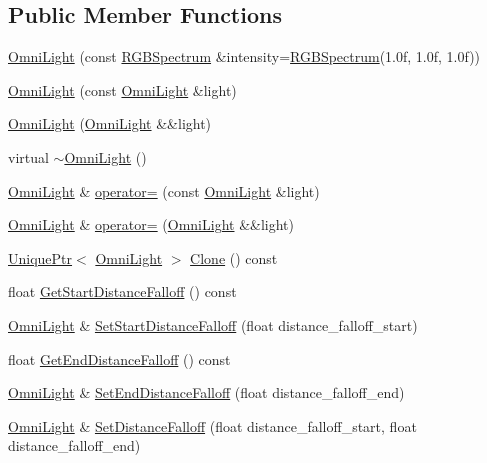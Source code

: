 \subsection*{Public Member Functions}
\begin{DoxyCompactItemize}
\item 
\hyperlink{classmage_1_1_omni_light_a94794dd7c19fcac0c0d0b9d83108513b}{Omni\+Light} (const \hyperlink{structmage_1_1_r_g_b_spectrum}{R\+G\+B\+Spectrum} \&intensity=\hyperlink{structmage_1_1_r_g_b_spectrum}{R\+G\+B\+Spectrum}(1.\+0f, 1.\+0f, 1.\+0f))
\item 
\hyperlink{classmage_1_1_omni_light_accf10bcdf8ed523cfb04129f5345ef92}{Omni\+Light} (const \hyperlink{classmage_1_1_omni_light}{Omni\+Light} \&light)
\item 
\hyperlink{classmage_1_1_omni_light_ae0353cedc67d88be2f4b88374482933d}{Omni\+Light} (\hyperlink{classmage_1_1_omni_light}{Omni\+Light} \&\&light)
\item 
virtual \hyperlink{classmage_1_1_omni_light_af6f4921499b430041966f38aac920b69}{$\sim$\+Omni\+Light} ()
\item 
\hyperlink{classmage_1_1_omni_light}{Omni\+Light} \& \hyperlink{classmage_1_1_omni_light_a7bdce151d327daef5e1f31daedcc4627}{operator=} (const \hyperlink{classmage_1_1_omni_light}{Omni\+Light} \&light)
\item 
\hyperlink{classmage_1_1_omni_light}{Omni\+Light} \& \hyperlink{classmage_1_1_omni_light_a287a54dede61e65efe4493ec20531428}{operator=} (\hyperlink{classmage_1_1_omni_light}{Omni\+Light} \&\&light)
\item 
\hyperlink{namespacemage_a8c307fbcc33bce9b7f2aa4c26c3b95cf}{Unique\+Ptr}$<$ \hyperlink{classmage_1_1_omni_light}{Omni\+Light} $>$ \hyperlink{classmage_1_1_omni_light_a82325924de65733314dcf2b87e926d60}{Clone} () const
\item 
float \hyperlink{classmage_1_1_omni_light_ab37a3e3880f519f40f9c9eaa786ba769}{Get\+Start\+Distance\+Falloff} () const
\item 
\hyperlink{classmage_1_1_omni_light}{Omni\+Light} \& \hyperlink{classmage_1_1_omni_light_a3d8adcbc2e6c712eae738ddfd47454f6}{Set\+Start\+Distance\+Falloff} (float distance\+\_\+falloff\+\_\+start)
\item 
float \hyperlink{classmage_1_1_omni_light_ac3a8638331aa35ffd8967ccc78ca2df7}{Get\+End\+Distance\+Falloff} () const
\item 
\hyperlink{classmage_1_1_omni_light}{Omni\+Light} \& \hyperlink{classmage_1_1_omni_light_a45990ae06ca074654247d70f85e98094}{Set\+End\+Distance\+Falloff} (float distance\+\_\+falloff\+\_\+end)
\item 
\hyperlink{classmage_1_1_omni_light}{Omni\+Light} \& \hyperlink{classmage_1_1_omni_light_a148c13f7b6191c88f069730777d31eb3}{Set\+Distance\+Falloff} (float distance\+\_\+falloff\+\_\+start, float distance\+\_\+falloff\+\_\+end)
\end{DoxyCompactItemize}
